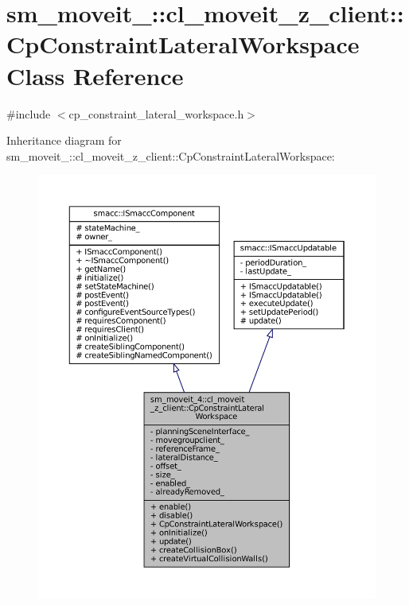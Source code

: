 \hypertarget{classsm__moveit__4_1_1cl__moveit__z__client_1_1CpConstraintLateralWorkspace}{}\section{sm\+\_\+moveit\+\_\+:\+:cl\+\_\+moveit\+\_\+z\+\_\+client\+:\+:Cp\+Constraint\+Lateral\+Workspace Class Reference}
\label{classsm__moveit__4_1_1cl__moveit__z__client_1_1CpConstraintLateralWorkspace}


{\ttfamily \#include $<$cp\+\_\+constraint\+\_\+lateral\+\_\+workspace.\+h$>$}



Inheritance diagram for sm\+\_\+moveit\+\_\+:\+:cl\+\_\+moveit\+\_\+z\+\_\+client\+:\+:Cp\+Constraint\+Lateral\+Workspace\+:
\nopagebreak
\begin{figure}[H]
\begin{center}
\leavevmode
\includegraphics[width=350pt]{classsm__moveit__4_1_1cl__moveit__z__client_1_1CpConstraintLateralWorkspace__inherit__graph}
\end{center}
\end{figure}


